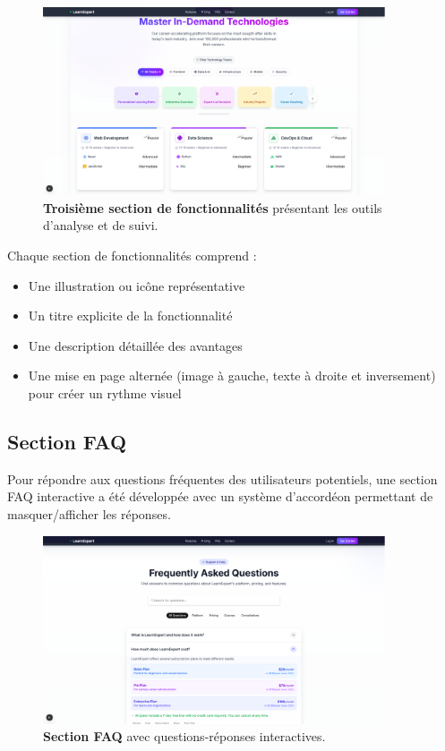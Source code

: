 \begin{figure}[h!]
  \centering
  \includegraphics[width=0.9\textwidth,keepaspectratio]{week_2_img/fetchersection_3.png}
  \caption{\textbf{Troisième section de fonctionnalités} présentant les outils d'analyse et de suivi.}
  \label{fig:features_section_3}
\end{figure}

Chaque section de fonctionnalités comprend :
\begin{itemize}
  \item Une illustration ou icône représentative
  \item Un titre explicite de la fonctionnalité
  \item Une description détaillée des avantages
  \item Une mise en page alternée (image à gauche, texte à droite et inversement) pour créer un rythme visuel
\end{itemize}

\subsection{Section FAQ}
Pour répondre aux questions fréquentes des utilisateurs potentiels, une section FAQ interactive a été développée avec un système d'accordéon permettant de masquer/afficher les réponses.

\begin{figure}[h!]
  \centering
  \includegraphics[width=0.9\textwidth,keepaspectratio]{week_2_img/faqsection.png}
  \caption{\textbf{Section FAQ} avec questions-réponses interactives.}
  \label{fig:faq_section}
\end{figure}

